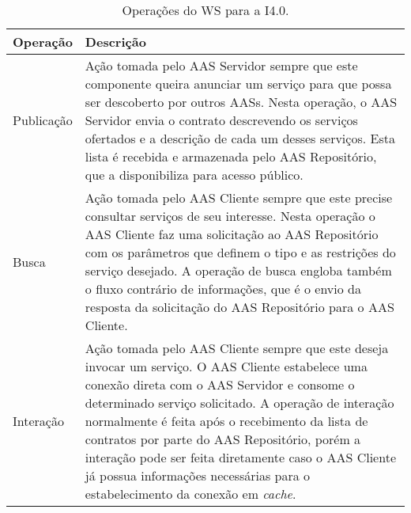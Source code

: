 \begin{table}[htb]
	\centering
	\caption{Operações do WS para a I4.0.}
	\begin{tabular}{p{3cm}p{12cm}}
		\hline
		\textbf{Operação}
		 & \textbf{Descrição}                                                                                                                                                                                                                                                                                                                                                                                                                                           \\

		\hline
		Publicação
		 & Ação tomada pelo AAS Servidor sempre que este componente queira anunciar um serviço para que possa ser descoberto por outros AASs. Nesta operação, o AAS Servidor envia o contrato descrevendo os serviços ofertados e a descrição de cada um desses serviços. Esta lista é recebida e armazenada pelo AAS Repositório, que a disponibiliza para acesso público.                                                                                             \\

		\hline
		Busca
		 & Ação tomada pelo AAS Cliente sempre que este precise consultar serviços de seu interesse. Nesta operação o AAS Cliente faz uma solicitação ao AAS Repositório com os parâmetros que definem o tipo e as restrições do serviço desejado. A operação de busca engloba também o fluxo contrário de informações, que é o envio da resposta da solicitação do AAS Repositório para o AAS Cliente.                                                                 \\

		\hline
		Interação
		 & Ação tomada pelo AAS Cliente sempre que este deseja invocar um serviço. O AAS Cliente estabelece uma conexão direta com o AAS Servidor e consome o determinado serviço solicitado. A operação de interação normalmente é feita após o recebimento da lista de contratos por parte do AAS Repositório, porém a interação pode ser feita diretamente caso o AAS Cliente já possua informações necessárias para o estabelecimento da conexão em \textit{cache}. \\

		\hline
	\end{tabular}

	\label{tab:operacoes-ws}
\end{table}

